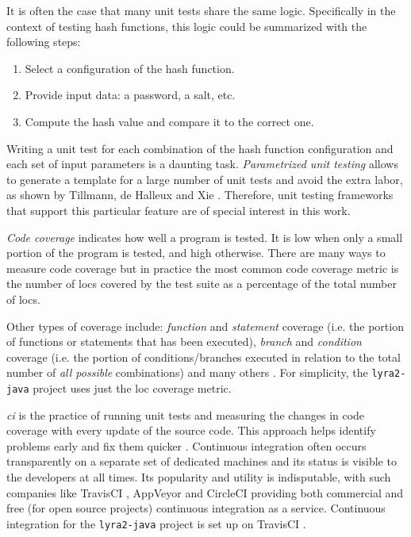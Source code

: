 It is often the case that many unit tests share the same logic. Specifically in the context of testing hash functions, this logic could be summarized with the following steps:

\begin{enumerate}
    \item Select a configuration of the hash function.
    \item Provide input data: a password, a salt, etc.
    \item Compute the hash value and compare it to the correct one.
   \end{enumerate}

Writing a unit test for each combination of the hash function configuration and each set of input parameters is a daunting task. \emph{Parametrized unit testing} allows to generate a template for a large number of unit tests and avoid the extra labor, as shown by Tillmann, de Halleux and Xie \cite{tillmann:2010:parametrized-unit-tests-rock}. Therefore, unit testing frameworks that support this particular feature are of special interest in this work.

\emph{Code coverage} indicates how well a program is tested. It is low when only a small portion of the program is tested, and high otherwise. There are many ways to measure code coverage \cite{elberzhager:2012:reducing-effort} but in practice the most common code coverage metric is the number of \glspl{loc} covered by the test suite as a percentage of the total number of \glspl{loc}.

Other types of coverage include: \emph{function} and \emph{statement} coverage (i.e. the portion of functions or statements that has been executed), \emph{branch} and \emph{condition} coverage (i.e. the portion of conditions/branches executed in relation to the total number of \emph{all possible} combinations) and many others \cite{Astels:2003:TDD:864016}. For simplicity, the \texttt{lyra2-java} project uses just the \gls{loc} coverage metric.

\emph{\Gls{ci}} is the practice of running unit tests and measuring the changes in code coverage with every update of the source code. This approach helps identify problems early and fix them quicker \cite{williams:2010:unit-tests-rock}. Continuous integration often occurs transparently on a separate set of dedicated machines and its status is visible to the developers at all times. Its popularity and utility is indisputable, with such companies like TravisCI \cite{travis:2017:homepage}, AppVeyor \cite{appveyor:2017:homepage} and CircleCI \cite{circleci:2017:homepage} providing both commercial and free (for open source projects) continuous integration as a service. Continuous integration for the \texttt{lyra2-java} project is set up on TravisCI \cite{travis:2017:lyra}.
